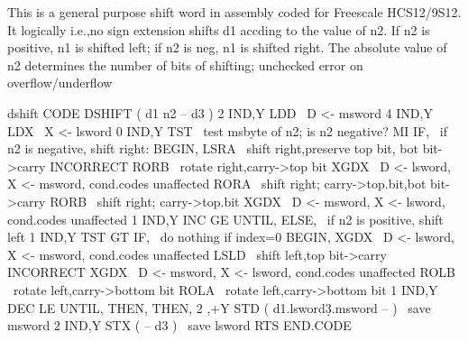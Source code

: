 This is a general purpose shift word in assembly coded for Freescale
HCS12/9S12.  It logically {i.e.,no sign extension} shifts d1 accding
to the value of n2.  If n2 is positive, n1 is shifted left; if n2 is
neg, n1 is shifted right.  The absolute value of n2 determines the 
number of bits of shifting; unchecked error on overflow/underflow
\begin{chunk}{dshift}
CODE DSHIFT    ( d1 n2 -- d3 )
2 IND,Y LDD   \ D <- msword
4 IND,Y LDX   \ X <- lsword
0 IND,Y TST   \ test msbyte of n2; is n2 negative?
MI IF,        \ if n2 is negative, shift right:
    BEGIN,
      LSRA    \ shift right,preserve top bit, bot bit->carry INCORRECT
      RORB    \ rotate right,carry->top bit
      XGDX    \ D <- lsword, X <- msword, cond.codes unaffected
      RORA    \ shift right; carry->top.bit,bot bit->carry
      RORB    \ shift right; carry->top.bit
      XGDX    \ D <- msword, X <- lsword, cond.codes unaffected
      1 IND,Y INC
    GE UNTIL,
ELSE,         \ if n2 is positive, shift left
  1 IND,Y TST
  GT IF,      \ do nothing if index=0
    BEGIN,
      XGDX    \ D <- lsword, X <- msword, cond.codes unaffected
      LSLD    \ shift left,top bit->carry INCORRECT
      XGDX    \ D <- msword, X <- lsword, cond.codes unaffected
      ROLB    \ rotate left,carry->bottom bit
      ROLA    \ rotate left,carry->bottom bit
      1 IND,Y DEC
    LE UNTIL,
  THEN,
THEN,
2 ,+Y STD     ( d1.lsword\d3.msword -- ) \ save msword
2 IND,Y STX   ( -- d3 ) \ save lsword
RTS
END.CODE

\end{chunk}

